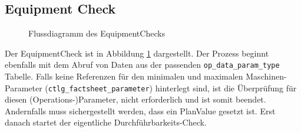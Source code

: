 \subsection{Equipment Check}

\begin{figure}[!htbp]
    \centering
    \caption{Flussdiagramm des \gls{EquipmentCheck}s}
    \label{fig:equipment-check}
\end{figure}

Der \gls{EquipmentCheck} ist in Abbildung \ref{fig:equipment-check} dargestellt. Der Prozess beginnt ebenfalls mit dem Abruf von Daten aus der passenden \texttt{op\_data\_param\_type} Tabelle. Falls keine Referenzen für den minimalen und maximalen Maschinen-Parameter (\texttt{ctlg\_\-factsheet\_\-parameter}) hinterlegt sind, ist die Überprüfung für diesen (Operations-)\-Parameter, nicht erforderlich und ist somit beendet. Andernfalls muss sichergestellt werden, dass ein PlanValue gesetzt ist. Erst danach startet der eigentliche Durchführbarkeits-Check.

